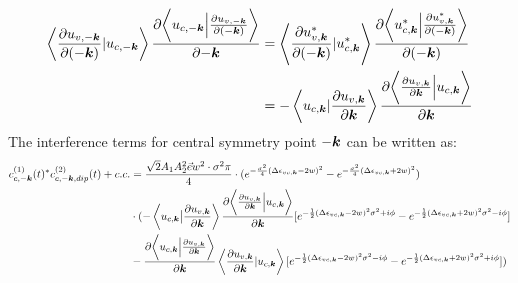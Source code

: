  \begin{align}
     \left \langle \frac{\partial u_{v,-\boldsymbol k}}{\partial (-\boldsymbol k)} |  u_{c,-\boldsymbol k} \right \rangle \frac{\partial{\left \langle u_{c,-\boldsymbol k}\Big |\frac{\partial u_{v,-\boldsymbol k}}{\partial (-\boldsymbol k)} \right \rangle}}{\partial {-\boldsymbol k}} 
     &=
     \left \langle \frac{\partial u_{v,\boldsymbol k}^*}{\partial (-\boldsymbol k)} |  u_{c,\boldsymbol k}^* \right \rangle \frac{\partial{\left \langle u_{c,\boldsymbol k}^*\Big |\frac{\partial u_{v,\boldsymbol k}^*}{\partial (-\boldsymbol k)} \right \rangle}}{\partial {(-\boldsymbol k)}} \\
     &=
     -\left \langle  u_{c,\boldsymbol k}| \frac{\partial u_{v,\boldsymbol k}}{\partial \boldsymbol k} \right \rangle 
     \frac{\partial{\left \langle \frac{\partial u_{v,\boldsymbol k}}{\partial \boldsymbol k} \Big |u_{c,\boldsymbol k} \right \rangle}}{\partial {\boldsymbol k}} 
 \end{align}
 The interference terms for central symmetry point $-\boldsymbol k$ can be written as:
\begin{equation}
\begin{aligned}
    c^{(1)}_{c,-\boldsymbol k}(t)^* c^{(2)}_{c,-\boldsymbol k,dip}(t) +c.c.&=\frac{\sqrt{2}A_1A_2^2 \vec e w^2 \cdot \sigma^2 \pi}{4}\cdot(e^{-\frac{\sigma^2}{4} (\Delta \epsilon_{vc,\boldsymbol k}-2w)^2}-e^{-\frac{\sigma^2}{4} (\Delta \epsilon_{vc,\boldsymbol k}+2w)^2})\\
    &\cdot (-\left \langle u_{c,\boldsymbol k} \big | \frac{\partial u_{v,\boldsymbol k}}{\partial \boldsymbol k}  \right \rangle \frac{\partial{\left \langle\frac{\partial u_{v,\boldsymbol k}}{\partial \boldsymbol k}\Big |u_{c,\boldsymbol k}\right \rangle}}{\partial {\boldsymbol k}}
    [e^{-\frac{1}{2}(\Delta \epsilon_{vc,\boldsymbol k} - 2w)^2 \sigma^2+i\phi}
    -e^{-\frac{1}{2}(\Delta \epsilon_{vc,\boldsymbol k} + 2w)^2 \sigma^2-i\phi}]\\
    &-\frac{\partial{\left \langle u_{c,\boldsymbol k}\Big |\frac{\partial u_{v,\boldsymbol k}}{\partial \boldsymbol k} \right \rangle}}{\partial {\boldsymbol k}}
    \left \langle \frac{\partial u_{v,\boldsymbol k}}{\partial \boldsymbol k} |  u_{c,\boldsymbol k} \right \rangle
     [e^{-\frac{1}{2}(\Delta \epsilon_{vc,\boldsymbol k} - 2w)^2 \sigma^2-i\phi}
    -e^{-\frac{1}{2}(\Delta \epsilon_{vc,\boldsymbol k} + 2w)^2 \sigma^2+i\phi}]
    )
\end{aligned}
\end{equation}

